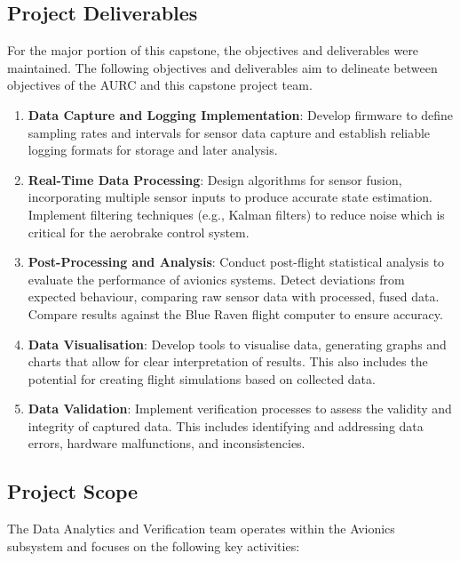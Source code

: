 \subsection{Project Deliverables}
For the major portion of this capstone, the objectives and deliverables were maintained. The following objectives and deliverables aim to delineate between objectives of the AURC and this capstone project team.

\begin{enumerate}
    \item \textbf{Data Capture and Logging Implementation}: Develop firmware to define sampling rates and intervals for sensor data capture and establish reliable logging formats for storage and later analysis.
    \item \textbf{Real-Time Data Processing}: Design algorithms for sensor fusion, incorporating multiple sensor inputs to produce accurate state estimation. Implement filtering techniques (e.g., Kalman filters) to reduce noise which is critical for the aerobrake control system.
    \item \textbf{Post-Processing and Analysis}: Conduct post-flight statistical analysis to evaluate the performance of avionics systems. Detect deviations from expected behaviour, comparing raw sensor data with processed, fused data. Compare results against the Blue Raven flight computer to ensure accuracy.
    \item \textbf{Data Visualisation}: Develop tools to visualise data, generating graphs and charts that allow for clear interpretation of results. This also includes the potential for creating flight simulations based on collected data.
    \item \textbf{Data Validation}: Implement verification processes to assess the validity and integrity of captured data. This includes identifying and addressing data errors, hardware malfunctions, and inconsistencies.
\end{enumerate}

\subsection{Project Scope}
The Data Analytics and Verification team operates within the Avionics subsystem and focuses on the following key activities:

